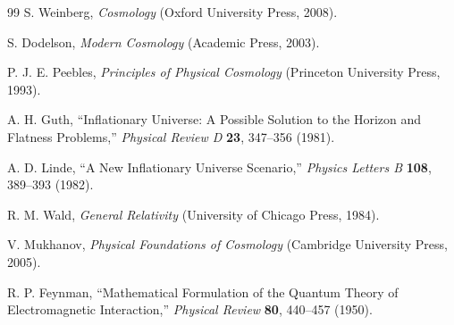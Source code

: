 \documentclass[aip,jmp,reprint,onecolumn,nofootinbib]{revtex4-2}
\begin{document}
\begin{thebibliography}{99}
  S. Weinberg, \textit{Cosmology} (Oxford University Press, 2008).

  S. Dodelson, \textit{Modern Cosmology} (Academic Press, 2003). 

 P. J. E. Peebles, \textit{Principles of Physical Cosmology} (Princeton University Press, 1993).

  A. H. Guth, ``Inflationary Universe: A Possible Solution to the Horizon and Flatness Problems,'' \textit{Physical Review D} \textbf{23}, 347--356 (1981).

  A. D. Linde, ``A New Inflationary Universe Scenario,'' \textit{Physics Letters B} \textbf{108}, 389--393 (1982).

  R. M. Wald, \textit{General Relativity} (University of Chicago Press, 1984).

  V. Mukhanov, \textit{Physical Foundations of Cosmology} (Cambridge University Press, 2005).

 R. P. Feynman, ``Mathematical Formulation of the Quantum Theory of Electromagnetic Interaction,'' \textit{Physical Review} \textbf{80}, 440--457 (1950).

 \end{thebibliography}
\end{document}
